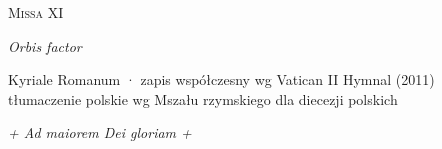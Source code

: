 



\begin{center}
  {\Huge\scshape Missa XI}\par\smallskip
  {\Large\itshape Orbis factor}\par\smallskip
  {\small Kyriale Romanum · zapis współczesny wg Vatican II Hymnal (2011)\\
   tłumaczenie polskie wg Mszału rzymskiego dla diecezji polskich}
\end{center}



\clearpage




\vfill
{\centering\itshape + Ad maiorem Dei gloriam +\par}


